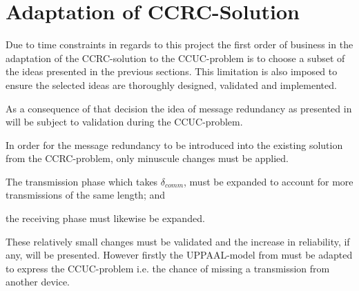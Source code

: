\section{Adaptation of CCRC-Solution} %
\label{sec:adaptation_of_ccrc_solution}
Due to time constraints in regards to this project the first order of business in the adaptation of the CCRC-solution to the CCUC-problem is to choose a subset of the ideas presented in the previous sections.
This limitation is also imposed to ensure the selected ideas are thoroughly designed, validated and implemented.

As a consequence of that decision the idea of message redundancy as presented in  will be subject to  validation during the CCUC-problem.

In order for the message redundancy to be introduced into the existing solution from the CCRC-problem, only minuscule changes must be applied.
\begin{enumberate}
    \item The transmission phase which takes $\delta_{comm}$, must be expanded to account for more transmissions of the same length; and
    \item the receiving phase must likewise be expanded.
\end{enumberate}
These relatively small changes must be validated and the increase in reliability, if any, will be presented.
However firstly the UPPAAL-model from  must be adapted to express the CCUC-problem i.e. the chance of missing a transmission from another device.

